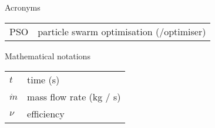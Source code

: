 \begin{nomenclature}

{\huge Acronyms}

\begin{table}[ht]
	\begin{center}
		\begin{tabular}{l l}
			PSO  & particle swarm optimisation (/optimiser)\\
		\end{tabular}
	\end{center}
\end{table}

\clearpage

{\huge Mathematical notations}

\begin{table}[ht]
	\begin{center}
		\begin{tabular}{l l}
			$t$				& time (s)\\
			$\dot{m}$		& mass flow rate (kg / s)\\
			$\nu$			& efficiency
		\end{tabular}
	\end{center}
\end{table}

\end{nomenclature}